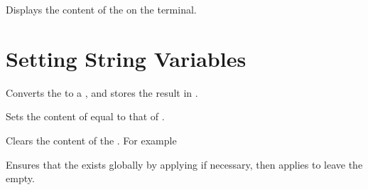 \documentclass[oneside]{book}
\begin{document}
\begin{function}{\StrVarShow}
\begin{syntax}
 
\end{syntax}
Displays the content of the  on the terminal.
\begin{codehigh}
\StrSet {}
\StrVarShow \lTmpiStr
\end{codehigh}
\end{function}

\section{Setting String Variables}

\begin{function}{\StrSet}
\begin{syntax}
  
\end{syntax}
Converts the  to a , and stores the
result in .
\begin{demohigh}
\StrSet {}
\StrUse \lTmpiStr
\end{demohigh}
\end{function}

\begin{function}{\StrSetEq}
\begin{syntax}
  
\end{syntax}
Sets the content of  equal to that of .
\begin{demohigh}
\StrSet {}
\StrSetEq \lTmpbStr \lTmpaStr
\StrUse \lTmpbStr
\end{demohigh}
\end{function}

\begin{function}{\StrClear}
\begin{syntax}
 
\end{syntax}
Clears the content of the . For example
\begin{demohigh}
\StrSet {}
\StrClear \lTmpjStr
\StrSet {}
\StrUse \lTmpjStr
\end{demohigh}
\end{function}

\begin{function}{\StrClearNew}
\begin{syntax}
 
\end{syntax}
Ensures that the  exists globally by applying
 if necessary, then applies  to leave
the  empty.
\begin{codehigh}
\StrClearNew \lFooSomeStr
\StrUse \lFooSomeStr
\end{codehigh}
\end{function}
\end{document}
